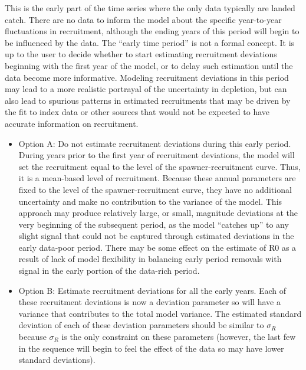 This is the early part of the time series where the only data typically are landed catch. There are no data to inform the model about the specific year-to-year fluctuations in recruitment, although the ending years of this period will begin to be influenced by the data. The ``early time period'' is not a formal concept. It is up to the user to decide whether to start estimating recruitment deviations beginning with the first year of the model, or to delay such estimation until the data become more informative. Modeling recruitment deviations in this period may lead to a more realistic portrayal of the uncertainty in depletion, but can also lead to spurious patterns in estimated recruitments that may be driven by the fit to index data or other sources that would not be expected to have accurate information on recruitment.
	\begin{itemize}
		\item Option A: Do not estimate recruitment deviations during this early period. During years prior to the first year of recruitment deviations, the model will set the recruitment equal to the level of the spawner-recruitment curve. Thus, it is a mean-based level of recruitment. Because these annual parameters are fixed to the level of the spawner-recruitment curve, they have no additional uncertainty and make no contribution to the variance of the model. This approach may produce relatively large, or small, magnitude deviations at the very beginning of the subsequent period, as the model ``catches up'' to any slight signal that could not be captured through estimated deviations in the early data-poor period. There may be some effect on the estimate of R0 as a result of lack of model flexibility in balancing early period removals with signal in the early portion of the data-rich period.  
		\item Option B: Estimate recruitment deviations for all the early years. Each of these recruitment deviations is now a deviation parameter so will have a variance that contributes to the total model variance. The estimated standard deviation of each of these deviation parameters should be similar to $\sigma_R$ because $\sigma_R$ is the only constraint on these parameters (however, the last few in the sequence will begin to feel the effect of the data so may have lower standard deviations). 		
	\end{itemize}
	
